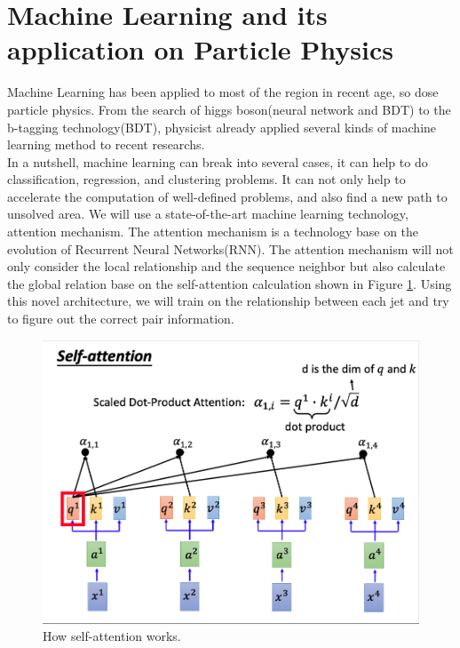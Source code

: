 \section{Machine Learning and its application on Particle Physics}

Machine Learning has been applied to most of the region in recent age, so dose particle physics. From the search of higgs boson(neural network and BDT) to the b-tagging technology(BDT\cite{Paganini:2017dpd}), physicist already applied several kinds of machine learning method to recent researchs.
\\
In a nutshell, machine learning can break into several cases, it can help to do classification, regression, and clustering problems. It can not only help to accelerate the computation of well-defined problems, and also find a new path to unsolved area. We will use a state-of-the-art machine learning technology, attention mechanism. The attention mechanism is a technology base on the evolution of Recurrent Neural Networks(RNN).\cite{A.Vaswani:2017} The attention mechanism will not only consider the local relationship and the sequence neighbor but also calculate the global relation base on the self-attention calculation shown in Figure \ref{fig:attention}. Using this novel architecture, we will train on the relationship between each jet and try to figure out the correct pair information.
\\
\begin{figure}[h]
	\centering
	\includegraphics[width=0.8\linewidth]{Figures/attention.png}
	\caption{How self-attention works.\cite{HY.Lee:2019}}
	\label{fig:attention}
\end{figure}
